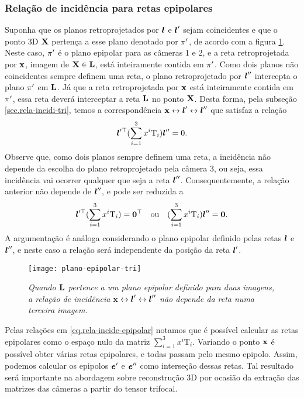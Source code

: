 \subsubsection{Relação de incidência para retas epipolares}\label{sec.rela-reta-epipolar-tri}
Suponha que os planos retroprojetados por $\boldsymbol{l}$ e $\boldsymbol{l}'$ sejam coincidentes e que o ponto 3D $\mathbf{X}$ pertença a esse plano denotado por $\pi'$, de acordo com a figura \ref{fig.plano-epipolar-tri}. Neste caso, $\pi'$ é o plano epipolar para as câmeras 1 e 2, e a reta retroprojetada por $\mathbf{x}$, imagem de $\mathbf{X}\in{\bf L}$, está inteiramente contida em $\pi'$. Como dois planos não coincidentes sempre definem uma reta, o plano retroprojetado por $\boldsymbol{l}''$ intercepta o plano $\pi'$ em ${\bf L}$. Já que a reta retroprojetada por $\mathbf{x}$ está inteiramente contida em $\pi'$, essa reta deverá interceptar a reta ${\bf L}$ no ponto $\mathbf{X}$. Desta forma, pela subseção \ref{sec.rela-incidi-tri}, temos a correspondência $\mathbf{x}\leftrightarrow\boldsymbol{l}'\leftrightarrow\boldsymbol{l}''$ que satisfaz a relação
\begin{equation*}
\boldsymbol{l}'^\top(\sum_{i=1}^3 x^i\mbox{T}_i)\boldsymbol{l}''=0.
\end{equation*}
Observe que, como dois planos sempre definem uma reta, a incidência não depende da escolha do plano retroprojetado pela câmera 3, ou seja, essa incidência vai ocorrer qualquer que seja a reta $\boldsymbol{l}''$. Consequentemente, a relação anterior não depende de $\boldsymbol{l}''$, e pode ser reduzida a 
\begin{equation}\label{eq.rela-incide-epipolar}
\boldsymbol{l}'^\top(\sum_{i=1}^3 x^i\mbox{T}_i)={\bf 0}^\top\quad\text{ou}\quad(\sum_{i=1}^3 x^i\mbox{T}_i)\boldsymbol{l}''={\bf 0}.
\end{equation}
A argumentação é análoga considerando o plano epipolar definido pelas retas $\boldsymbol{l}$ e $\boldsymbol{l}''$, e neste caso a relação será independente da posição da reta $\boldsymbol{l}'$. 
\begin{figure}[!htb]
\centering
\texttt{[image: plano-epipolar-tri]}
\caption{{\it Quando ${\bf L}$ pertence a um plano epipolar definido para duas imagens, a relação de incidência $\mathbf{x}\leftrightarrow\boldsymbol{l}'\leftrightarrow\boldsymbol{l}''$ não depende da reta numa terceira imagem.}}
\label{fig.plano-epipolar-tri}
\end{figure}

Pelas relações em \ref{eq.rela-incide-epipolar} notamos que é possível calcular as retas epipolares como o espaço nulo da matriz $\sum_{i=1}^3 x^i \mbox{T}_i$. Variando o ponto $\mathbf{x}$ é possível obter várias retas epipolares, e todas passam pelo mesmo epipolo. Assim, podemos calcular os epipolos $\boldsymbol{e}'$ e $\boldsymbol{e}''$ como interseção dessas retas. Tal resultado será importante na abordagem sobre reconstrução 3D por ocasião da extração das matrizes das câmeras a partir do tensor trifocal.


